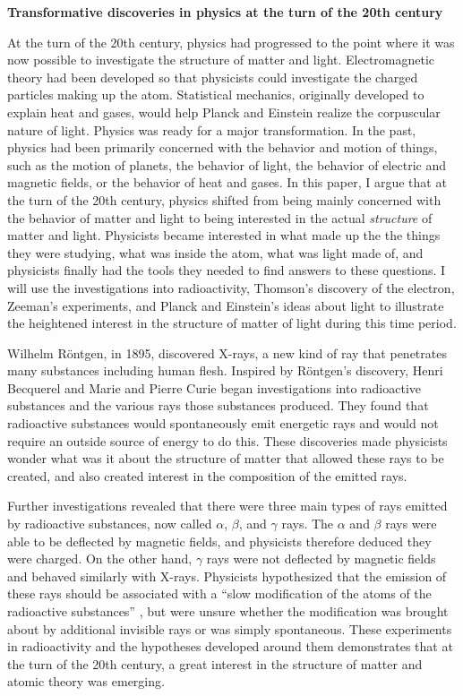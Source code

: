 \documentclass[12pt, oneside, letterpaper, fleqn]{article}
\begin{document}
\begin{center}
\textbf{Transformative discoveries in physics at the turn of the 20th
century}
\end{center}

At the turn of the 20th century, physics had progressed to the point
where it was now possible to investigate the structure of matter and
light. Electromagnetic theory had been developed so that physicists
could investigate the charged particles making up the atom. Statistical
mechanics, originally developed to explain heat and gases, would help
Planck and Einstein realize the corpuscular nature of light. Physics was
ready for a major transformation. In the past, physics had been
primarily concerned with the behavior and motion of things, such as the
motion of planets, the behavior of light, the behavior of electric and
magnetic fields, or the behavior of heat and gases. In this paper, I
argue that at the turn of the 20th century, physics shifted from being
mainly concerned with the behavior of matter and light to being
interested in the actual \textit{structure} of matter and light.
Physicists became interested in what made up the the things they were
studying, what was inside the atom, what was light made of, and
physicists finally had the tools they needed to find answers to these
questions. I will use the investigations into radioactivity, Thomson's
discovery of the electron, Zeeman's experiments, and Planck and
Einstein's ideas about light to illustrate the heightened interest in
the structure of matter of light during this time period.

Wilhelm R\"ontgen, in 1895, discovered X-rays, a new kind of ray that
penetrates many substances including human flesh. Inspired by
R\"ontgen's discovery, Henri Becquerel and Marie and Pierre Curie began
investigations into radioactive substances and the various rays those
substances produced. They found that radioactive substances would
spontaneously emit energetic rays and would not require an outside
source of energy to do this. These discoveries made physicists wonder
what was it about the structure of matter that allowed these rays to be
created, and also created interest in the composition of the emitted
rays.

Further investigations revealed that there were three main types of rays
emitted by radioactive substances, now called $\alpha$, $\beta$, and
$\gamma$ rays. The $\alpha$ and $\beta$ rays were able to be deflected
by magnetic fields, and physicists therefore deduced they were charged.
On the other hand, $\gamma$ rays were not deflected by magnetic fields
and behaved similarly with X-rays. Physicists hypothesized that the
emission of these rays should be associated with a ``slow modification
of the atoms of the radioactive substances'' \cite{becquerel}, but were
unsure whether the modification was brought about by additional
invisible rays or was simply spontaneous. These experiments in
radioactivity and the hypotheses developed around them demonstrates that
at the turn of the 20th century, a great interest in the structure of
matter and atomic theory was emerging.
\end{document}
